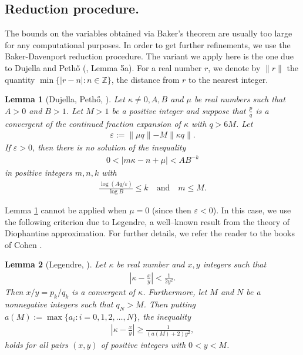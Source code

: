 \documentclass[10pt,a4paper]{article}
\newtheorem{lemma}{Lemma}
\begin{document}
\subsection{Reduction procedure.}
The bounds on the variables obtained via Baker's theorem are usually too large for any computational purposes. In order to get further refinements, we use the Baker-Davenport reduction procedure. The variant we apply here is the one due to Dujella and Peth\H{o} (\cite{DP}, Lemma 5a). For a real number $r$, we denote by $\parallel r \parallel$ the quantity $\min \{|r - n| : n \in \mathbb{Z} \}$, the distance from $r$ to the nearest integer.
\begin{lemma}[Dujella, Peth\H o, \cite{DP}]\label{DP}
Let $\kappa \neq 0, A, B$ and $\mu$ be real numbers such that $A > 0$ and $B > 1$. Let $M > 1$ be a positive integer and suppose that $\frac{p}{q}$ is a convergent of the continued fraction expansion of $\kappa$ with $q > 6M$. Let 
\begin{align*}
\varepsilon := \parallel \mu q \parallel - M \parallel \kappa q \parallel.
\end{align*}
If $\varepsilon > 0$, then there is no solution of the inequality
\begin{align*}
0 < |m \kappa - n + \mu| < AB^{-k}
\end{align*}
in positive integers $m,n,k$ with
\begin{align*}
\frac{\log (Aq/\varepsilon)}{\log B} \leq k \quad \text{and} \quad m \leq M.
\end{align*}
\end{lemma}

\noindent
Lemma \ref{DP} cannot be applied when $\mu=0$ (since then $\varepsilon<0$). In this case, we use the following criterion due to Legendre, a well--known result from the theory of Diophantine approximation. For further details, we refer the reader to the books of Cohen \cite{HC1, HC2}.
\begin{lemma}[Legendre, \cite{HC1, HC2}]
\label{lg}
Let $\kappa$ be real number and $x,y$ integers such that
\begin{align*}
\left|\kappa-\frac{x}{y}\right|<\frac{1}{2y^2}.
\end{align*}
Then $x/y=p_k/q_k$ is a convergent of $\kappa$. Furthermore, let  $ M $ and $ N $ be a nonnegative integers such that $ q_N> M $. Then putting $ a(M):=\max\{a_{i}: i=0, 1, 2, \ldots, N\} $, the inequality 
\begin{align*}
\left|\kappa-\frac{x}{y}\right|\ge \frac{1}{(a(M)+2)y^2},
\end{align*}
holds for all pairs $ (x,y) $ of positive integers with $ 0<y<M $.
\end{lemma}
\end{document}
